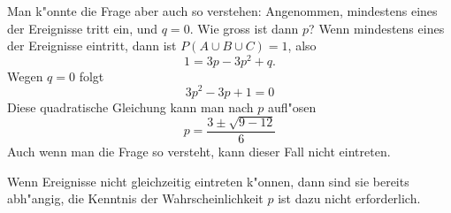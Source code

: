 \begin{loesung}
\begin{teilaufgaben}
Man k"onnte die Frage aber auch so verstehen: Angenommen, mindestens
eines der Ereignisse tritt ein, und $q=0$. Wie gross ist dann $p$?
Wenn mindestens eines der Ereignisse eintritt, dann ist
$P(A\cup B\cup C)=1$, also
\[
1=3p-3p^2+q.
\]
Wegen $q=0$ folgt
\[
3p^2-3p+1=0
\]
Diese quadratische Gleichung kann man nach $p$ aufl"osen
\[
p=\frac{3\pm\sqrt{9-12}}{6}
\]
Auch wenn man die Frage so versteht, kann dieser Fall nicht eintreten.
\item
Wenn Ereignisse nicht gleichzeitig eintreten k"onnen, dann sind
sie bereits abh"angig, die Kenntnis der Wahrscheinlichkeit $p$
ist dazu nicht erforderlich.
\qedhere
\end{teilaufgaben}
\end{loesung}


